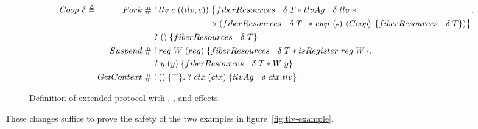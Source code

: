 \begin{figure}[ht]
    \begin{equation*}
        \proto{}~\delta \triangleq \begin{aligned}[t]
            Fork\;       & \#\; \begin{aligned}[t]
                                     & !\; tlv\; e\; ((tlv, e))\; \begin{aligned}[t]
                                                   & \big\{ \gsFiberResources{}\; \delta\; T \ast \gsTLVAg{}\; \delta\; tlv\; \ast                              \\
                                                   & \later\; (\gsFiberResources{}\; \delta\; T \wand{} \ewp{e}{Coop}{\gsFiberResources{}\; \delta\; T}) \big\}
                                              \end{aligned} . \\
                                     & ?\; ()\; \{ \gsFiberResources{}\; \delta\; T \}
                                \end{aligned}                                 \\
            Suspend\;    & \#\; \begin{aligned}[t]
                                     & !\; reg\; W\; (reg)\; \{\gsFiberResources{}\; \delta\; T \ast \gsIsReg{}\; reg\; W\}. \\
                                     & ?\; y\; (y)\; \{ \gsFiberResources{}\; \delta\; T \ast W\; y \}
                                \end{aligned} \\
            GetContext\; & \#\; !\; ()\; \{\top\}.\; ?\; ctx\; (ctx)\; \{ \gsTLVAg{}\; \delta\; ctx.tlv \}
        \end{aligned}
    \end{equation*}
    \caption{Definition of extended \proto{} protocol with \efork{}, \esuspend{}, and \egetctx{} effects.}
    \label{fig:coop-protocol-ext}
\end{figure}

These changes suffice to prove the safety of the two examples in figure~\ref{fig:tlv-example}.

